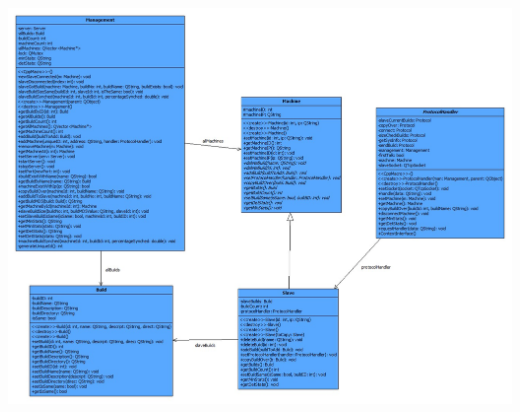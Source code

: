 \documentclass[a4paper,12pt,final]{article}
\begin{document}
\begin{center}
	\includegraphics[angle = 90,scale = 0.47]{Slave.jpg}
\end{center}
\newpage
\end{document}
